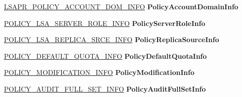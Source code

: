 \begin{DoxyCompactItemize}
\item 
\mbox{\label{union___l_s_a_p_r___p_o_l_i_c_y___i_n_f_o_r_m_a_t_i_o_n_a59265416d0d945f7a7f4a64c1cfb6ad9}} 
\hyperlink{struct___l_s_a_p_r___p_o_l_i_c_y___a_c_c_o_u_n_t___d_o_m___i_n_f_o}{L\+S\+A\+P\+R\+\_\+\+P\+O\+L\+I\+C\+Y\+\_\+\+A\+C\+C\+O\+U\+N\+T\+\_\+\+D\+O\+M\+\_\+\+I\+N\+FO} {\bfseries Policy\+Account\+Domain\+Info}
\item 
\mbox{\label{union___l_s_a_p_r___p_o_l_i_c_y___i_n_f_o_r_m_a_t_i_o_n_a02ac4191673eef3ac1da08aa25086f7c}} 
\hyperlink{struct___p_o_l_i_c_y___l_s_a___s_e_r_v_e_r___r_o_l_e___i_n_f_o}{P\+O\+L\+I\+C\+Y\+\_\+\+L\+S\+A\+\_\+\+S\+E\+R\+V\+E\+R\+\_\+\+R\+O\+L\+E\+\_\+\+I\+N\+FO} {\bfseries Policy\+Server\+Role\+Info}
\item 
\mbox{\label{union___l_s_a_p_r___p_o_l_i_c_y___i_n_f_o_r_m_a_t_i_o_n_a8f22619260dd21283ffb10fc34d9ac0a}} 
\hyperlink{struct___p_o_l_i_c_y___l_s_a___r_e_p_l_i_c_a___s_r_c_e___i_n_f_o}{P\+O\+L\+I\+C\+Y\+\_\+\+L\+S\+A\+\_\+\+R\+E\+P\+L\+I\+C\+A\+\_\+\+S\+R\+C\+E\+\_\+\+I\+N\+FO} {\bfseries Policy\+Replica\+Source\+Info}
\item 
\mbox{\label{union___l_s_a_p_r___p_o_l_i_c_y___i_n_f_o_r_m_a_t_i_o_n_a901541089727256031341d487580627b}} 
\hyperlink{struct___p_o_l_i_c_y___d_e_f_a_u_l_t___q_u_o_t_a___i_n_f_o}{P\+O\+L\+I\+C\+Y\+\_\+\+D\+E\+F\+A\+U\+L\+T\+\_\+\+Q\+U\+O\+T\+A\+\_\+\+I\+N\+FO} {\bfseries Policy\+Default\+Quota\+Info}
\item 
\mbox{\label{union___l_s_a_p_r___p_o_l_i_c_y___i_n_f_o_r_m_a_t_i_o_n_a54319638971f3dad30c58dcd24dc46f5}} 
\hyperlink{struct___p_o_l_i_c_y___m_o_d_i_f_i_c_a_t_i_o_n___i_n_f_o}{P\+O\+L\+I\+C\+Y\+\_\+\+M\+O\+D\+I\+F\+I\+C\+A\+T\+I\+O\+N\+\_\+\+I\+N\+FO} {\bfseries Policy\+Modification\+Info}
\item 
\mbox{\label{union___l_s_a_p_r___p_o_l_i_c_y___i_n_f_o_r_m_a_t_i_o_n_a71861c4e8213eae2de7086edbcb62b84}} 
\hyperlink{struct___p_o_l_i_c_y___a_u_d_i_t___f_u_l_l___s_e_t___i_n_f_o}{P\+O\+L\+I\+C\+Y\+\_\+\+A\+U\+D\+I\+T\+\_\+\+F\+U\+L\+L\+\_\+\+S\+E\+T\+\_\+\+I\+N\+FO} {\bfseries Policy\+Audit\+Full\+Set\+Info}

\end{DoxyCompactItemize}
